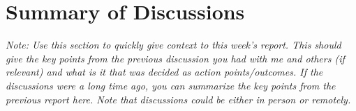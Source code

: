 \documentclass{article}
\begin{document}
\printAffiliationsAndNotice{\icmlEqualContribution} %


\section{Summary of Discussions}
{\it Note: Use this section to quickly give context to this week's report.
This should give the key points from the previous discussion you had with me
and others (if relevant) and what is it that was decided as action
points/outcomes. If the discussions were a long time ago, you can summarize
the key points from the previous report here. Note that discussions could be
either in person or remotely.}
\end{document}
